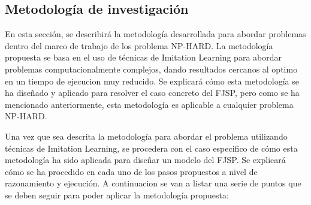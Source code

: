 \subsection{Metodología de investigación}
En esta sección, se describirá la metodología desarrollada para abordar problemas 
dentro del marco de trabajo de los problema NP-HARD. La metodología propuesta se 
basa en el uso de técnicas de Imitation Learning para abordar problemas computacionalmente
complejos, dando resultados cercanos al optimo en un tiempo de ejecucion muy reducido. 
Se explicará cómo esta metodología se ha diseñado y aplicado para resolver el caso concreto 
del FJSP, pero como se ha mencionado anteriormente, esta metodología es aplicable a cualquier
problema NP-HARD.\medskip

Una vez que sea descrita la metodología para abordar el problema utilizando 
técnicas de Imitation Learning, se procedera con el caso especifico de cómo esta metodología 
ha sido aplicada para diseñar un modelo del FJSP. Se explicará cómo se ha procedido en cada uno 
de los pasos propuestos a nivel de razonamiento y ejecución. A continuacion se van a listar una 
serie de puntos que se deben seguir para poder aplicar la metodología propuesta:

